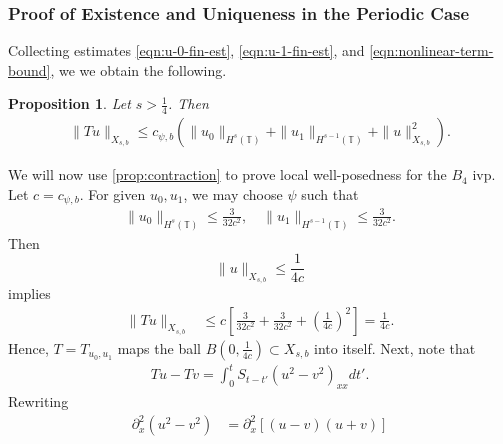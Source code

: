 \documentclass[12pt,reqno]{amsart}
\numberwithin{equation}{section}  %
\numberwithin{figure}{section}
\newcommand{\ci}{\mathbb{T}}
\newcommand{\p}{\partial}
\theoremstyle{plain}
\newtheorem{proposition}{Proposition}
\theoremstyle{definition}
\theoremstyle{remark}
\begin{document}
\subsubsection{Proof of Existence and Uniqueness in the Periodic Case}
\label{sssec:proof-b4-per-case}
%
%
Collecting estimates \eqref{eqn:u-0-fin-est}, \eqref{eqn:u-1-fin-est}, and
\eqref{eqn:nonlinear-term-bound}, we 
we obtain the following.
%
%				 
%
\begin{proposition}
\label{prop:contraction}
Let $s > \frac{1}{4}$. Then
%
\begin{equation*}
	\begin{split}
    \|Tu\|_{X_{s,b}} \le c_{\psi, b} \left( \|u_0 \|_{H^s(\ci)} + \|u_1 \|_{H^{s-1}(\ci)}
    + \|u\|_{X_{s,b}}^2 
		\right).
	\end{split}
\end{equation*}
%
\end{proposition}
We will now use \autoref{prop:contraction} to prove local well-posedness for the 
$B_4$ ivp. Let $c = c_{\psi, b}$. For given $u_0, u_1$, we may choose $\psi$ such
that 
%
\begin{equation*}
	\begin{split}
    \|u_0\|_{H^s(\ci)} \le \frac{3}{32c^2}, \quad \|u_1\|_{H^{s-1}(\ci)} \le \frac{3}{32c^2}.
	\end{split}
\end{equation*}
%
Then $$\|u\|_{X_{s,b}} \le \frac{1}{4c}$$ implies
%
\begin{equation*}
	\begin{split}
		\|T u \|_{X_{s,b}} 
		& \le c \left[ \frac{3}{32c^2} + \frac{3}{32c^2}+ \left( 
		\frac{1}{4c} \right)^2 \right]
		=  \frac{1}{4c}.
	\end{split}
\end{equation*}
%
Hence, $T=T_{u_0, u_1}$ maps the ball $B\left( 0, \frac{1}{4c} \right) \subset
X_{s,b}$ into itself. Next, note that 
%
\begin{equation*}
	\begin{split}
		Tu - Tv = 
    \int_{0}^{t} S_{t-t'}
    (u^{2} - v^{2})_{xx} dt'.
  \end{split}
  \label{eqn:integral-form-dif}
\end{equation*}
%
Rewriting
%
\begin{equation*}
	\begin{split}
	\p_x^2 (u^2 - v^2)	
		& = \p_x^2[(u-v)(u+v)]
		\end{split}
\end{equation*}
\end{document}

